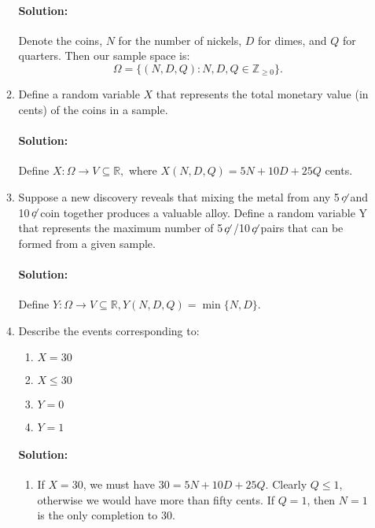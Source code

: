 \documentclass{article}
\newcommand{\cent}{\ensuremath{\,\not\!\!c\,\,}}
\begin{document}
\begin{enumerate}
\begin{enumerate}
        \paragraph{Solution: }Denote the coins, $N$ for the number of nickels, $D$ for dimes, and $Q $ for quarters. Then our sample space is:
        \[
        \Omega=\{(N,D,Q):N,D,Q\in \mathbb{Z}_{\ge 0}\} 
        .\] 
    \item Define a random variable $X$ that represents the total monetary value (in cents) of the coins in a sample.
        \paragraph{Solution: }Define $X:\Omega\to V\subseteq \mathbb{R},$ where $X(N,D,Q)=5N+10D+25Q$ cents.
    \item Suppose a new discovery reveals that mixing the metal from any 5\cent and 10\cent coin together produces a valuable alloy. Define a random variable Y that represents the maximum number of 5\cent/10\cent pairs that can be formed from a given sample.
        \paragraph{Solution: }Define $Y:\Omega\to V\subseteq \mathbb{R}, Y(N,D,Q)=\min \{N,D\} $.
    \item Describe the events corresponding to:
        \begin{enumerate}
            \item $X=30$
            \item $X \leq 30$
            \item $Y = 0$
            \item $Y = 1$
        \end{enumerate}
        \paragraph{Solution: }
        \begin{enumerate}
            \item If $X=30$, we must have $30=5N+10D+25Q$. Clearly  $Q\leq 1$, otherwise we would have more than fifty cents. If $Q=1$, then $N=1$ is the only completion to $30$.


\end{enumerate}
\end{enumerate}
\end{enumerate}
\end{document}
